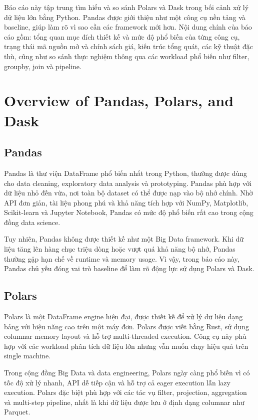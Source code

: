 \documentclass[12pt,a4paper]{article}
\begin{document}
Báo cáo này tập trung tìm hiểu và so sánh Polars và Dask trong bối cảnh xử lý dữ liệu lớn bằng Python. Pandas được giới thiệu như một công cụ nền tảng và baseline, giúp làm rõ vì sao cần các framework mới hơn. Nội dung chính của báo cáo gồm: tổng quan mục đích thiết kế và mức độ phổ biến của từng công cụ, trạng thái mã nguồn mở và chính sách giá, kiến trúc tổng quát, các kỹ thuật đặc thù, cũng như so sánh thực nghiệm thông qua các workload phổ biến như filter, groupby, join và pipeline.
\section{Overview of Pandas, Polars, and Dask}


\subsection{Pandas}

Pandas là thư viện DataFrame phổ biến nhất trong Python, thường được dùng cho data cleaning, exploratory data analysis và prototyping. Pandas phù hợp với dữ liệu nhỏ đến vừa, nơi toàn bộ dataset có thể được nạp vào bộ nhớ chính. Nhờ API đơn giản, tài liệu phong phú và khả năng tích hợp với NumPy, Matplotlib, Scikit-learn và Jupyter Notebook, Pandas có mức độ phổ biến rất cao trong cộng đồng data science.

Tuy nhiên, Pandas không được thiết kế như một Big Data framework. Khi dữ liệu tăng lên hàng chục triệu dòng hoặc vượt quá khả năng bộ nhớ, Pandas thường gặp hạn chế về runtime và memory usage. Vì vậy, trong báo cáo này, Pandas chủ yếu đóng vai trò baseline để làm rõ động lực sử dụng Polars và Dask.

\subsection{Polars}

Polars là một DataFrame engine hiện đại, được thiết kế để xử lý dữ liệu dạng bảng với hiệu năng cao trên một máy đơn. Polars được viết bằng Rust, sử dụng columnar memory layout và hỗ trợ multi-threaded execution. Công cụ này phù hợp với các workload phân tích dữ liệu lớn nhưng vẫn muốn chạy hiệu quả trên single machine.

Trong cộng đồng Big Data và data engineering, Polars ngày càng phổ biến vì có tốc độ xử lý nhanh, API dễ tiếp cận và hỗ trợ cả eager execution lẫn lazy execution. Polars đặc biệt phù hợp với các tác vụ filter, projection, aggregation và multi-step pipeline, nhất là khi dữ liệu được lưu ở định dạng columnar như Parquet.
\end{document}

